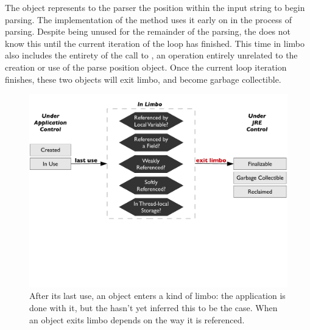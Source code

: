 The  object represents to the parser the position within the
input string to begin parsing. The implementation of the  method
uses it early on in the process of parsing. Despite being unused for the
remainder of the parsing, the \jre does not know this until the current
iteration of the loop has finished. This time in limbo also includes the
entirety of the call to , an operation entirely
unrelated to the creation or use of the parse position object. Once the current
loop iteration finishes, these two objects will exit limbo, and become garbage
collectible.

\begin{figure}
	\centering
	\includegraphics[width=\textwidth]{part4/Figures/lifetime/states}
	\caption{After its last use, an object enters a kind of limbo: the application
	is done with it, but the \jre hasn't yet inferred this to be the case. When an
	object exits limbo depends on the way it is referenced.}
		\label{fig:limbo-exit}
\end{figure}


